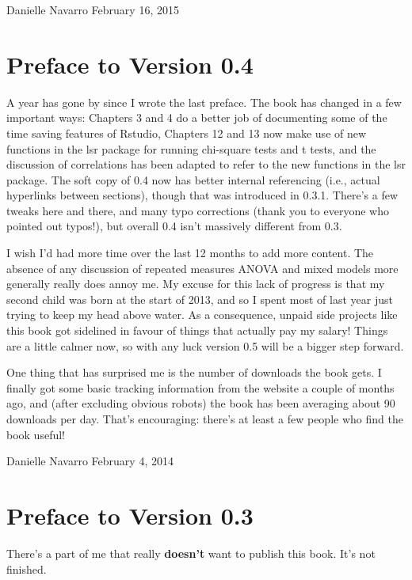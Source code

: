 \documentclass[
]{book}
\begin{document}
Danielle Navarro
February 16, 2015

\hypertarget{preface-to-version-0.4}{%
\section*{Preface to Version 0.4}\label{preface-to-version-0.4}}

A year has gone by since I wrote the last preface. The book has changed in a few important ways: Chapters 3 and 4 do a better job of documenting some of the time saving features of Rstudio, Chapters 12 and 13 now make use of new functions in the lsr package for running chi-square tests and t tests, and the discussion of correlations has been adapted to refer to the new functions in the lsr package. The soft copy of 0.4 now has better internal referencing (i.e., actual hyperlinks between sections), though that was introduced in 0.3.1. There's a few tweaks here and there, and many typo corrections (thank you to everyone who pointed out typos!), but overall 0.4 isn't massively different from 0.3.

I wish I'd had more time over the last 12 months to add more content. The absence of any discussion of repeated measures ANOVA and mixed models more generally really does annoy me. My excuse for this lack of progress is that my second child was born at the start of 2013, and so I spent most of last year just trying to keep my head above water. As a consequence, unpaid side projects like this book got sidelined in favour of things that actually pay my salary! Things are a little calmer now, so with any luck version 0.5 will be a bigger step forward.

One thing that has surprised me is the number of downloads the book gets. I finally got some basic tracking information from the website a couple of months ago, and (after excluding obvious robots) the book has been averaging about 90 downloads per day. That's encouraging: there's at least a few people who find the book useful!

Danielle Navarro
February 4, 2014

\hypertarget{preface-to-version-0.3}{%
\section*{Preface to Version 0.3}\label{preface-to-version-0.3}}

There's a part of me that really \textbf{doesn't} want to publish this book. It's not finished.
\end{document}
